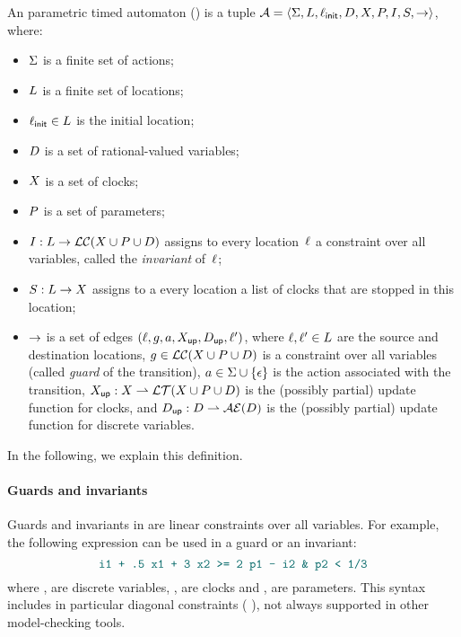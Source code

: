 \begin{definition}[\IPTA{}]\label{definition:IPTA}
	An \imitator{} parametric timed automaton (\emph{\IPTA{}}) is a tuple $\mathcal{A} = \langle\Sigma, L, \ell_{\textsf{init}}, D, X, P, I, S, {\rightarrow}\rangle$, where:
	\begin{itemize}
		\item $\Sigma$ is a finite set of actions;
		\item $L$ is a finite set of locations;
		\item $\ell_{\textsf{init}} \in L$ is the initial location;
		\item $D$ is a set of rational-valued variables;
		\item $X$ is a set of clocks;
		\item $P$ is a set of parameters;
		\item $I : L \rightarrow \mathcal{LC}(X \cup P \cup D)$ assigns to every location~$\ell$ a constraint over all variables, called the \emph{invariant} of~$\ell$;
		\item $S : L \rightarrow X$ assigns to a every location a list of clocks that are stopped in this location;
		\item ${\rightarrow}$ is a set of edges $(\ell, g, a, X_\mathsf{up}, D_\mathsf{up}, \ell')$, where
		      $\ell, \ell' \in L$ are the source and destination locations,
		      $g \in \mathcal{LC}(X \cup P \cup D)$ is a constraint over all variables (called \emph{guard} of the transition),
		      $a \in \Sigma \cup \{ \epsilon \}$ is the action associated with the transition,
		      $X_\mathsf{up} : X \rightharpoonup \mathcal{LT}(X \cup P \cup D)$ is the (possibly partial) update function for clocks, and
		      $D_\mathsf{up} : D \rightharpoonup \mathcal{AE}(D)$ is the (possibly partial) update function for discrete variables.
	\end{itemize}
\end{definition}

In the following, we explain this definition.

\paragraph{Guards and invariants}
Guards and invariants in \imitator{} are linear constraints over all variables.
For example, the following expression can be used in a guard or an invariant:
$$ \styleIMI{i1 + .5 x1 + 3 x2 >= 2 p1 - i2 \& p2 < 1/3} $$
where ,  are discrete variables, ,  are clocks and ,  are parameters.
This syntax includes in particular diagonal constraints (\eg{} ), not always supported in other model-checking tools.

